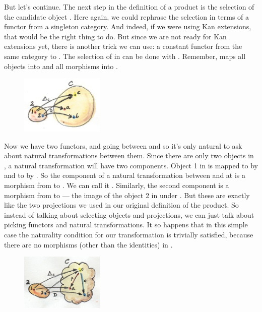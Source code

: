 But let's continue. The next step in the definition of a product is the
selection of the candidate object . Here again, we could
rephrase the selection in terms of a functor from a singleton category.
And indeed, if we were using Kan extensions, that would be the right
thing to do. But since we are not ready for Kan extensions yet, there is
another trick we can use: a constant functor \mathtext{\Delta} from the same category
 to . The selection of  in  can be
done with . Remember,  maps all
objects into  and all morphisms into .

\begin{figure}[H]
\centering
\includegraphics[width=1.56250in]{images/twodelta.jpg}
\end{figure}

\noindent
Now we have two functors,  and  going between
 and  so it's only natural to ask about natural
transformations between them. Since there are only two objects in
, a natural transformation will have two components. Object 1
in  is mapped to  by  and to
 by . So the component of a natural transformation between
 and  at  is a morphism from  to
. We can call it . Similarly, the second component
is a morphism  from  to  --- the image of
the object 2 in  under . But these are exactly like the two
projections we used in our original definition of the product. So
instead of talking about selecting objects and projections, we can just
talk about picking functors and natural transformations. It so happens
that in this simple case the naturality condition for our transformation
is trivially satisfied, because there are no morphisms (other than the
identities) in .

\begin{figure}[H]
\centering
\includegraphics[width=1.56250in]{images/productcone.jpg}
\end{figure}

